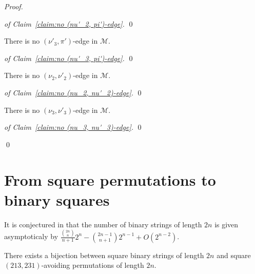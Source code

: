 \documentclass[a4paper,10pt]{llncs}
\begin{document}
\begin{proof}
  \begin{proof}[of Claim~\ref{claim:no (nu'_2, pi')-edge}]
    \qed
  \end{proof}

  \begin{claim}
    \label{claim:no (nu'_3, pi')-edge}
    There is no $(\nu'_3, \pi')$-edge in $\mathcal{M}$.
  \end{claim}

  \begin{proof}[of Claim~\ref{claim:no (nu'_3, pi')-edge}]
    \qed
  \end{proof}

  \begin{claim}
    \label{claim:no (nu_2, nu'_2)-edge}
    There is no $(\nu_2, \nu'_2)$-edge in $\mathcal{M}$.
  \end{claim}

  \begin{proof}[of Claim~\ref{claim:no (nu_2, nu'_2)-edge}]
    \qed
  \end{proof}

  \begin{claim}
    \label{claim:no (nu_3, nu'_3)-edge}
    There is no $(\nu_3, \nu'_3)$-edge in $\mathcal{M}$.
  \end{claim}

  \begin{proof}[of Claim~\ref{claim:no (nu_3, nu'_3)-edge}]
    \qed
  \end{proof}
\qed
\end{proof}


\section{From square permutations to binary squares}
\label{section:From square permutations to binary squares}

It is conjectured in \cite{Henshall:Rampersad:Shallit:2011} that the number of binary strings
of length $2n$ is given asymptoticaly by
$\frac{\binom{2n}{n}}{n+1} 2^n - \binom{2n-1}{n+1} 2^{n-1} + O(2^{n-2})$.

\begin{proposition}
  \label{proposition:bijection binary - (213,231)-avoiding}
  There exists a bijection between square binary strings of length $2n$ and
  square $(213,231)$-avoiding permutations of length $2n$.
\end{proposition}
\end{document}
